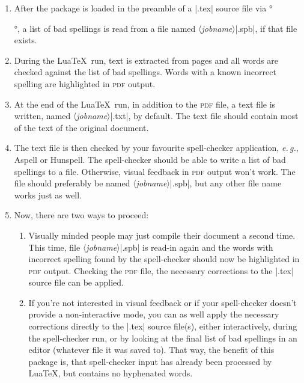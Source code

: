 \documentclass[11pt]{article}
\newcommand*{\acr}[1]{\mbox{\scshape#1}}
\newcommand*{\descr}[1]{〈\emph{#1}〉}
\newcommand*{\latinphrase}[1]{\foreignlanguage{latin}{\emph{#1}}}
\newcommand*{\lpeg}{\latinphrase{e.\,g.}\xspace}
\begin{document}
\begin{enumerate}

\item After the package is loaded in the preamble of a |.tex| source
  file via °\usepackage{spelling}°, a list of bad spellings is read from
  a file named \descr{jobname}|.spb|, if that file exists.

\item During the Lua\TeX\ run, text is extracted from pages and all
  words are checked against the list of bad spellings.  Words with a
  known incorrect spelling are highlighted in \acr{pdf} output.

\item At the end of the Lua\TeX\ run, in addition to the \acr{pdf} file,
  a text file is written, named \descr{jobname}|.txt|, by default.  The
  text file should contain most of the text of the original document.

\item The text file is then checked by your favourite spell-checker
  application, \lpeg, Aspell or Hunspell.  The spell-checker should be
  able to write a list of bad spellings to a file.  Otherwise, visual
  feedback in \acr{pdf} output won't work.  The file should preferably
  be named \descr{jobname}|.spb|, but any other file name works just as
  well.

\item Now, there are two ways to proceed:

  \begin{enumerate}

  \item Visually minded people may just compile their document a second
    time.  This time, file \descr{jobname}|.spb| is read-in again and
    the words with incorrect spelling found by the spell-checker should
    now be highlighted in \acr{pdf} output.  Checking the \acr{pdf}
    file, the necessary corrections to the |.tex| source file can be
    applied.

  \item If you're not interested in visual feedback or if your
    spell-checker doesn't provide a non-interactive mode, you can as
    well apply the necessary corrections directly to the |.tex| source
    file(s), either interactively, during the spell-checker run, or by
    looking at the final list of bad spellings in an editor (whatever
    file it was saved to).  That way, the benefit of this package is,
    that spell-checker input has already been processed by Lua\TeX, but
    contains no hyphenated words.

  \end{enumerate}

\end{enumerate}
\end{document}
